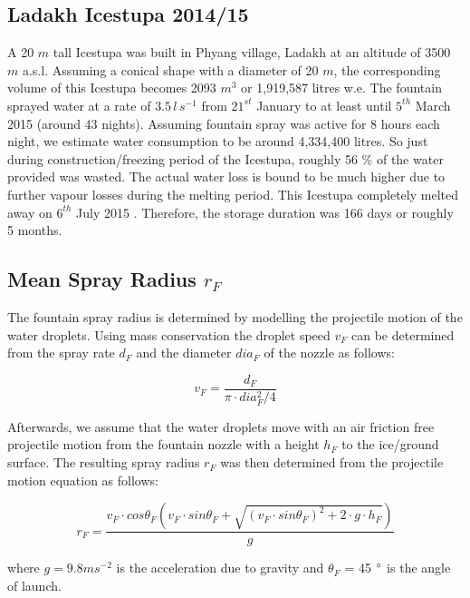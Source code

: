 \documentclass[utf8]{frontiersSCNS} %
\begin{document}
\subsection{Ladakh Icestupa 2014/15} \label{section:ladakhloss} A 20 $m$ tall
Icestupa \citep{iceheight} was built in Phyang village, Ladakh at an altitude
of 3500 $m$ a.s.l. Assuming a conical shape with a diameter of 20 $m$, the
corresponding volume of this Icestupa becomes 2093 $m^3$ or 1,919,587 litres
w.e. The fountain sprayed water at a rate of $3.5\, l\,s^{-1}$
\citep{waterinput} from $21^{st}$ January \citep{waterstart} to at least until
$5^{th}$ March 2015 \citep{waterend} (around 43 nights). Assuming fountain
spray was active for 8 hours each night, we estimate water consumption to be
around 4,334,400 litres. So just during construction/freezing period of the
Icestupa, roughly 56 \% of the water provided was wasted. The actual water
loss is bound to be much higher due to further vapour losses during the
melting period. This Icestupa completely melted away on $6^{th}$ July 2015
\citep{iceends}. Therefore, the storage duration was 166 days or roughly 5
months. 

\subsection{Mean Spray Radius $r_F$} \label{section:rF}

The fountain spray radius is determined by modelling the projectile motion of
the water droplets. Using mass conservation the droplet speed $v_F$ can be
determined from the spray rate $d_F$ and the diameter $dia_F$ of the nozzle as
follows:

\begin{equation} v_F = \frac{d_F}{\pi \cdot dia_F^2/4} \end{equation}

Afterwards, we assume that the water droplets move with an air friction free
projectile motion from the fountain nozzle with a height $h_F$ to the
ice/ground surface. The resulting spray radius $r_F$ was then determined from
the projectile motion equation as follows:

\begin{equation} r_F = \frac{v_F \cdot cos\theta_F (v_F \cdot sin\theta_F +
\sqrt{(v_F \cdot sin\theta_F)^{2} + 2 \cdot g \cdot h_F})}{g} \end{equation}

where $g = 9.8 m s^{-2}$ is the acceleration due to gravity and $\theta_F$ =
45 $\degree$ is the angle of launch.
\end{document}

